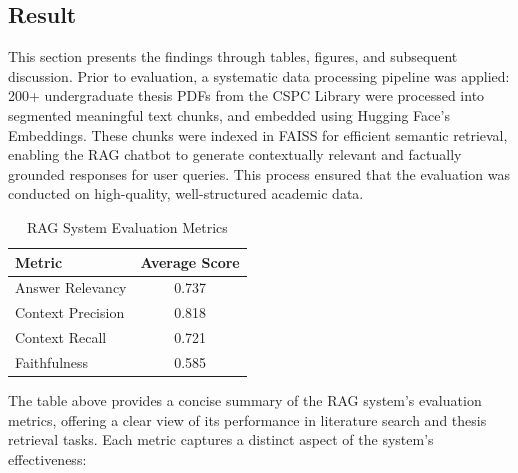 \begin{refsection}
\section{Result}
This section presents the findings through tables, figures, and subsequent discussion. Prior to evaluation, a systematic data processing pipeline was applied: 200+ undergraduate thesis PDFs from the CSPC Library were processed into segmented meaningful text chunks, and embedded using Hugging Face's Embeddings. These chunks were indexed in FAISS for efficient semantic retrieval, enabling the RAG chatbot to generate contextually relevant and factually grounded responses for user queries. This process ensured that the evaluation was conducted on high-quality, well-structured academic data.

\begin{table}[H]
    \centering
    \caption{RAG System Evaluation Metrics}
    \begin{tabular}{|l|c|}
        \hline
        \textbf{Metric} & \textbf{Average Score} \\
        \hline
        Answer Relevancy   & 0.737 \\
        Context Precision  & 0.818 \\
        Context Recall     & 0.721 \\
        Faithfulness       & 0.585 \\
        \hline
    \end{tabular}
\end{table}

\noindent The table above provides a concise summary of the RAG system’s evaluation metrics, offering a clear view of its performance in literature search and thesis retrieval tasks. Each metric captures a distinct aspect of the system’s effectiveness:


\end{refsection}
